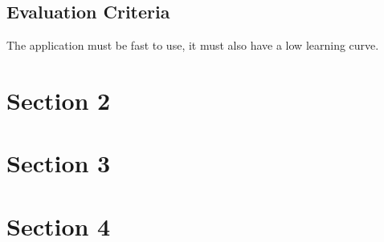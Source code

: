 \documentclass[a4paper,12pt]{memoir}
\begin{document}
\section*{Evaluation Criteria}

The application must be fast to use, it must also have a low learning curve.

\chapter*{Section 2}



\chapter*{Section 3}


\chapter*{Section 4}
\end{document}
